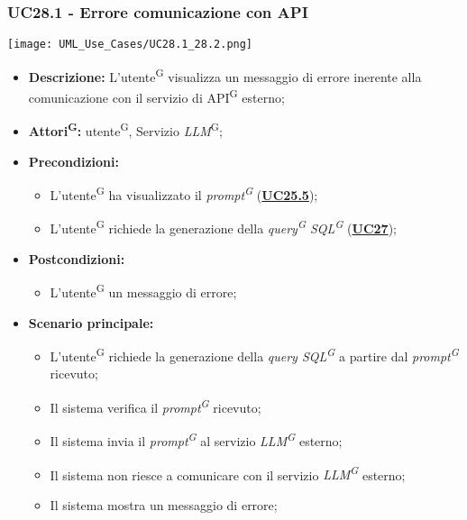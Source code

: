\subsubsection{UC28.1 - Errore comunicazione con API}
\label{sec:UC28.1}
\texttt{[image: UML\_Use\_Cases/UC28.1\_28.2.png]}
\begin{itemize}
	\item \textbf{Descrizione:} L'utente\textsuperscript{G} visualizza un messaggio di errore inerente alla comunicazione con il servizio di API\textsuperscript{G} esterno;
	\item \textbf{Attori\textsuperscript{G}:} utente\textsuperscript{G}, Servizio \textit{LLM}\textsuperscript{G};
	\item \textbf{Precondizioni:} 
	\begin{itemize}
		\item L'utente\textsuperscript{G} ha visualizzato il \textit{prompt\textsuperscript{G}} (\hyperref[sec:UC25.5]{\textbf{UC25.5}});
		\item L'utente\textsuperscript{G} richiede la generazione della \textit{query\textsuperscript{G} SQL\textsuperscript{G}} (\hyperref[sec:UC27]{\textbf{UC27}});
	\end{itemize}
	\item \textbf{Postcondizioni:} 
	\begin{itemize}
		\item L'utente\textsuperscript{G} un messaggio di errore;
	\end{itemize}
	\item \textbf{Scenario principale:}
	\begin{itemize}
		\item L'utente\textsuperscript{G} richiede la generazione della \textit{query SQL\textsuperscript{G}} a partire dal \textit{prompt\textsuperscript{G}} ricevuto;
		\item Il sistema verifica il \textit{prompt\textsuperscript{G}} ricevuto;
		\item Il sistema invia il \textit{prompt\textsuperscript{G}} al servizio \textit{LLM\textsuperscript{G}} esterno;
		\item Il sistema non riesce a comunicare con il servizio \textit{LLM\textsuperscript{G}} esterno;
		\item Il sistema mostra un messaggio di errore;
	\end{itemize}
\end{itemize}


